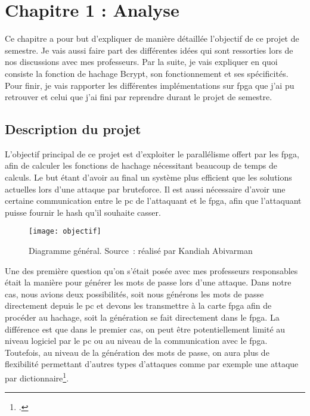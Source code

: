 \chapter{Chapitre 1 : Analyse}

Ce chapitre a pour but d'expliquer de manière détaillée l'objectif de ce projet de semestre. 
Je vais aussi faire part des différentes idées qui sont ressorties lors de nos discussions avec mes professeurs. 
Par la suite, je vais expliquer en quoi consiste la fonction de hachage Bcrypt, son fonctionnement et ses spécificités. 
Pour finir, je vais rapporter les différentes implémentations sur \gls{fpga} que j'ai pu retrouver et celui que j'ai fini par reprendre durant le projet de semestre. 

\section{Description du projet}

L'objectif principal de ce projet est d'exploiter le parallélisme offert par les \gls{fpga}, afin de calculer les fonctions de hachage nécessitant beaucoup de temps de calculs. 
Le but étant d'avoir au final un système plus efficient que les solutions actuelles lors d'une attaque par bruteforce. 
Il est aussi nécessaire d'avoir une certaine communication entre le \gls{pc} de l'attaquant et le \gls{fpga}, afin que l'attaquant puisse fournir le hash qu'il souhaite casser.

\begin{figure}[tbph!]
	\centering
	\texttt{[image: objectif]}
	\caption[Diagramme général]{Diagramme général. Source : réalisé par Kandiah Abivarman}
	\label{fig:objectif}
\end{figure}

Une des première question qu'on s'était posée avec mes professeurs responsables était la manière pour générer les mots de passe lors d'une attaque. 
Dans notre cas, nous avions deux possibilités, soit nous générons les mots de passe directement depuis le \gls{pc} et devons les transmettre à la carte \gls{fpga} afin de procéder au hachage, soit la génération se fait directement dans le \gls{fpga}. 
La différence est que dans le premier cas, on peut être potentiellement limité au niveau logiciel par le \gls{pc} ou au niveau de la communication avec le \gls{fpga}. 
Toutefois, au niveau de la génération des mots de passe, on aura plus de flexibilité permettant d'autres types d'attaques comme par exemple une attaque par dictionnaire\footcite{noauthor_attaque_2021}.

